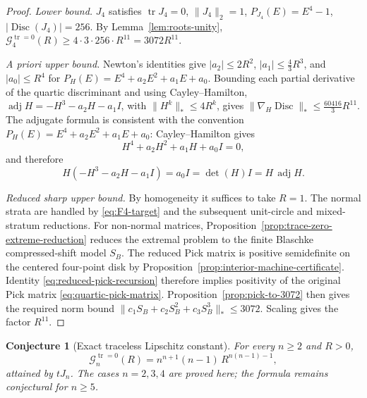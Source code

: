 \documentclass[11pt]{article}
\newtheorem{conjecture}[theorem]{Conjecture}
\numberwithin{equation}{section}
\DeclareMathOperator{\Disc}{Disc}
\DeclareMathOperator{\tr}{tr}
\newcommand{\cG}{\mathcal G}
\begin{document}
\begin{proof}
\emph{Lower bound.} $J_4$ satisfies $\tr J_4=0$, $\|J_4\|_2=1$, $P_{J_4}(E)=E^4-1$,
$|\Disc(J_4)|=256$.  By Lemma~\ref{lem:roots-unity},
$\cG_4^{\tr=0}(R)\ge4\cdot3\cdot256\cdot R^{11}=3072R^{11}$.

\emph{A priori upper bound.}  Newton's identities give
\(|a_2|\le2R^2\), \(|a_1|\le\tfrac43R^3\), and \(|a_0|\le R^4\) for
\(P_H(E)=E^4+a_2E^2+a_1E+a_0\).  Bounding each partial derivative of the
quartic discriminant and using Cayley--Hamilton,
\(\operatorname{adj}H=-H^3-a_2H-a_1I\), with \(\|H^k\|_*\le4R^k\), gives
\(\|\nabla_H\Disc\|_*\le\tfrac{60416}{3}R^{11}\).
The adjugate formula is consistent with the convention
\(P_H(E)=E^4+a_2E^2+a_1E+a_0\): Cayley--Hamilton gives
\[
  H^4+a_2H^2+a_1H+a_0I=0,
\]
and therefore
\[
  H(-H^3-a_2H-a_1I)=a_0I=\det(H)I=H\,\operatorname{adj}H.
\]

\emph{Reduced sharp upper bound.}  By homogeneity it suffices to take \(R=1\).
The normal strata are handled by \eqref{eq:F4-target} and the subsequent
unit-circle and mixed-stratum reductions.  For non-normal matrices,
Proposition~\ref{prop:trace-zero-extreme-reduction} reduces the extremal
problem to the finite Blaschke compressed-shift model \(S_B\).  The reduced
Pick matrix is positive
semidefinite on the centered four-point disk by
Proposition~\ref{prop:interior-machine-certificate}.  Identity
\eqref{eq:reduced-pick-recursion} therefore implies positivity of the original
Pick matrix \eqref{eq:quartic-pick-matrix}.  Proposition~\ref{prop:pick-to-3072}
then gives the required norm bound
\(\|c_1S_B+c_2S_B^2+c_3S_B^3\|_*\le3072\).
Scaling gives the factor \(R^{11}\).
\end{proof}

\begin{conjecture}[Exact traceless Lipschitz constant]\label{conj:sharp}
For every $n\ge2$ and $R>0$,
\[
  \cG_n^{\tr=0}(R)=n^{n+1}(n-1)\,R^{n(n-1)-1},
\]
attained by \(tJ_n\).  The cases \(n=2,3,4\) are proved here; the formula
remains conjectural for \(n\ge5\).
\end{conjecture}
\end{document}
